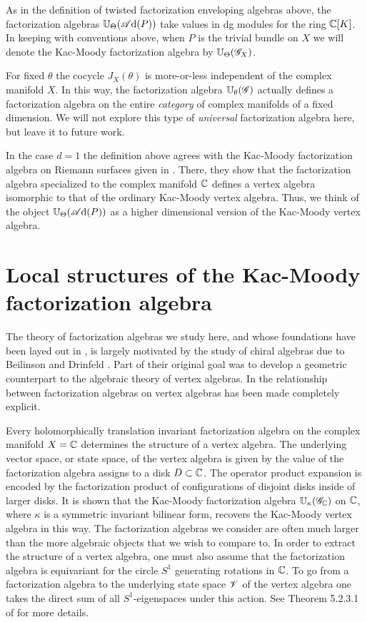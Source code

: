 \begin{rmk} 
As in the definition of twisted factorization enveloping algebras above, the factorization algebras $\mathbb U_\Theta(\mathscr A{\rm d}(P))$ take values in dg modules for the ring $\mathbb C[K]$. 
In keeping with conventions above, when $P$ is the trivial bundle on $X$ we will denote the Kac-Moody factorization algebra by $\mathbb U_\Theta(\mathscr G_X)$. 
\end{rmk}

\begin{rmk}
For fixed $\theta$ the cocycle $J_X(\theta)$ is more-or-less independent of the complex manifold $X$.
In this way, the factorization algebra $\mathbb U_\theta (\mathscr G)$ actually defines a factorization algebra on the entire {\em category} of complex manifolds of a fixed dimension.
We will not explore this type of {\em universal} factorization algebra here, but leave it to future work.
\end{rmk}

In the case $d = 1$ the definition above agrees with the Kac-Moody factorization algebra on Riemann surfaces given in \cite{CG1}.
There, they show that the factorization algebra specialized to the complex manifold $\mathbb C$ defines a vertex algebra isomorphic to that of the ordinary Kac-Moody vertex algebra.
Thus, we think of the object $\mathbb U_\Theta(\mathscr A{\rm d}(P))$ as a higher dimensional version of the Kac-Moody vertex algebra.

\section{Local structures of the Kac-Moody factorization algebra} \label{sec: sphere ops}

The theory of factorization algebras we study here, and whose foundations have been layed out in \cite{CG1}, is largely motivated by the study of chiral algebras due to Beilinson and Drinfeld \cite{BD}.
Part of their original goal was to develop a geometric counterpart to the algebraic theory of vertex algebras. 
In \cite{CG1} the relationship between factorization algebras on vertex algebras has been made completely explicit. 

Every holomorphically translation invariant factorization algebra on the complex manifold $X = \mathbb C$ determines the structure of a vertex algebra.
The underlying vector space, or state space, of the vertex algebra is given by the value of the factorization algebra assigns to a disk $D \subset \mathbb C$. 
The operator product expansion is encoded by the factorization product of configurations of disjoint disks inside of larger disks. 
It is shown that the Kac-Moody factorization algebra $\mathbb U_{\kappa}(\mathscr G_\mathbb C)$ on $\mathbb C$, where $\kappa$ is a symmetric invariant bilinear form, recovers the Kac-Moody vertex algebra in this way. 
The factorization algebras we consider are often much larger than the more algebraic objects that we wish to compare to. 
In order to extract the structure of a vertex algebra, one must also assume that the factorization algebra is equivariant for the circle $S^1$ generating rotations in $\mathbb C$. 
To go from a factorization algebra to the underlying state space $\mathscr V$ of the vertex algebra one takes the direct sum of all $S^1$-eigenspaces under this action. 
See Theorem 5.2.3.1 of \cite{CG1} for more details.

